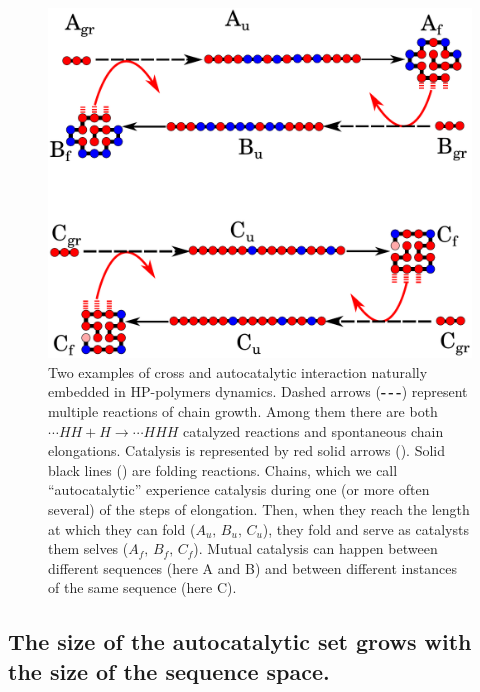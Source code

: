 \documentclass[5p,times]{elsarticle}
\newcommand*{\red}[1]{\textcolor{red}{#1}}
\begin{document}
\begin{figure}[h!]
  \centering
  \includegraphics[width=0.9\columnwidth]{pictures/catalysis-kinEx-all.pdf}
  \caption{\footnotesize{Two examples of cross and autocatalytic interaction naturally embedded in 
HP-polymers dynamics. Dashed arrows (\textbf{-\,-\,-}) represent multiple 
reactions of chain growth. Among them there are both $\cdots HH+H\to \cdots HHH$ catalyzed 
reactions and spontaneous chain elongations. Catalysis is 
represented by red solid arrows (\red{\textbf{\textemdash}}). Solid black lines 
(\textbf{\textemdash}) are folding reactions. Chains, which we call ``autocatalytic'' experience 
catalysis during one (or more often several) of the steps of elongation. Then, when they reach the 
length at which they can fold ($A_u,\, B_u,\, C_u$), they fold and serve as catalysts them selves 
($A_f,\, B_f,\, C_f$). Mutual catalysis can happen between different sequences (here A and B) and 
between different instances of the same sequence (here C).}}
  \label{fig:kinExamples}
\end{figure}

\subsection{The size of the autocatalytic set grows with the size of the sequence space.}
\end{document}

